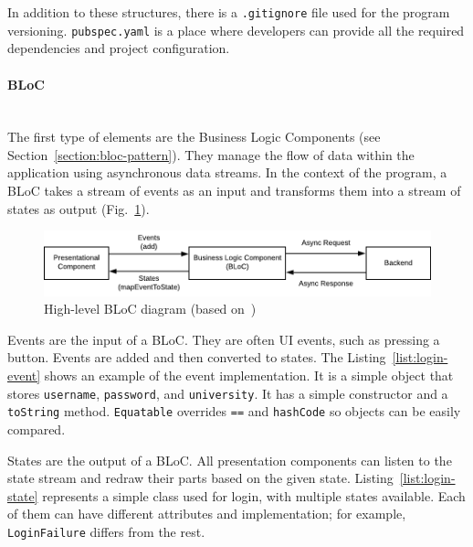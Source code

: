 In addition to these structures, there is a \texttt{.gitignore} file used for the program versioning. \texttt{pubspec.yaml} is a place where developers can provide all the required dependencies and project configuration.


\paragraph{\large{BLoC}}\mbox{}\\[2pt]
The first type of elements are the Business Logic Components (see Section~\ref{section:bloc-pattern}). They manage the flow of data within the application using asynchronous data streams. In the context of the program, a BLoC takes a stream of events as an input and transforms them into a stream of states as output (Fig.~\ref{fig:bloc-diagram}).

\begin{figure}[htb]
    \centering
    \includegraphics[]{fig04/bloc_diagram.pdf}
    \caption{High-level BLoC diagram (based on~\cite{bloc-diagram})}
    \label{fig:bloc-diagram}
\end{figure}

Events are the input of a BLoC. They are often UI events, such as pressing a button. Events are added and then converted to states. The Listing~\ref{list:login-event} shows an example of the event implementation. It is a simple object that stores \texttt{username}, \texttt{password}, and \texttt{university}. It has a simple constructor and a \texttt{toString} method. \texttt{Equatable} overrides \texttt{==} and \texttt{hashCode} so objects can be easily compared.



States are the output of a BLoC. All presentation components can listen to the state stream and redraw their parts based on the given state. Listing~\ref{list:login-state} represents a simple class used for login, with multiple states available. Each of them can have different attributes and implementation; for example, \texttt{LoginFailure} differs from the rest.

